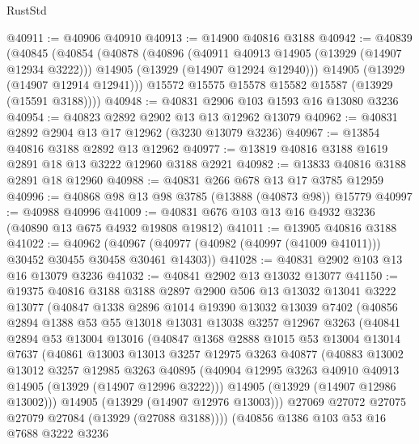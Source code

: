 \begin{lexlean}{RustStd}
\begin{coremodule}
@40911 := @40906 @40910
@40913 := @14900 @40816 @3188
@40942 := @40839
    (@40845
      (@40854
        (@40878
          (@40896
            (@40911 @40913 @14905 (@13929 (@14907 @12934 @3222)))
            @14905
            (@13929 (@14907 @12924 @12940)))
          @14905
          (@13929 (@14907 @12914 @12941)))
        @15572
        @15575
        @15578
        @15582
        @15587
        (@13929 (@15591 @3188))))
@40948 := @40831 @2906 @103 @1593 @16 @13080 @3236
@40954 := @40823 @2892 @2902 @13 @13 @12962 @13079
@40962 := @40831 @2892 @2904 @13 @17 @12962 (@3230 @13079 @3236)
@40967 := @13854 @40816 @3188 @2892 @13 @12962
@40977 := @13819 @40816 @3188 @1619 @2891 @18 @13 @3222 @12960 @3188 @2921
@40982 := @13833 @40816 @3188 @2891 @18 @12960
@40988 := @40831 @266 @678 @13 @17 @3785 @12959
@40996 := @40868 @98 @13 @98 @3785 (@13888 (@40873 @98)) @15779
@40997 := @40988 @40996
@41009 := @40831 @676 @103 @13 @16 @4932 @3236 (@40890 @13 @675 @4932 @19808 @19812)
@41011 := @13905 @40816 @3188
@41022 := @40962
    (@40967 (@40977 (@40982 (@40997 (@41009 @41011))) @30452 @30455 @30458 @30461 @14303))
@41028 := @40831 @2902 @103 @13 @16 @13079 @3236
@41032 := @40841 @2902 @13 @13032 @13077
@41150 := @19375
    @40816
    @3188
    @3188
    @2897
    @2900
    @506
    @13
    @13032
    @13041
    @3222
    @13077
    (@40847
      @1338
      @2896
      @1014
      @19390
      @13032
      @13039
      @7402
      (@40856
        @2894
        @1388
        @53
        @55
        @13018
        @13031
        @13038
        @3257
        @12967
        @3263
        (@40841
          @2894
          @53
          @13004
          @13016
          (@40847
            @1368
            @2888
            @1015
            @53
            @13004
            @13014
            @7637
            (@40861
              @13003
              @13013
              @3257
              @12975
              @3263
              @40877
              (@40883
                @13002
                @13012
                @3257
                @12985
                @3263
                @40895
                (@40904 @12995 @3263 @40910 @40913 @14905 (@13929 (@14907 @12996 @3222)))
                @14905
                (@13929 (@14907 @12986 @13002)))
              @14905
              (@13929 (@14907 @12976 @13003)))
            @27069
            @27072
            @27075
            @27079
            @27084
            (@13929 (@27088 @3188))))
        (@40856
          @1386
          @103
          @53
          @16
          @7688
          @3222
          @3236

\end{coremodule}
\end{lexlean}
